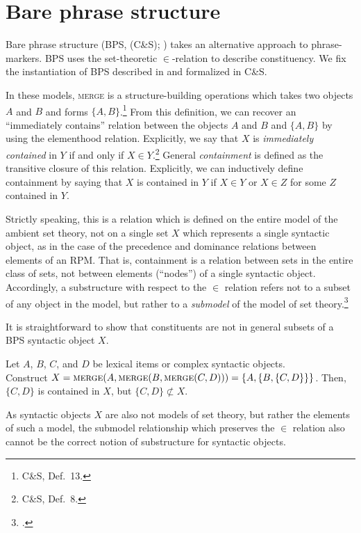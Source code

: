 \documentclass[output=paper]{langsci/langscibook}
\begin{document}
\section{Bare phrase structure}

Bare phrase structure (\gls{BPS}, \citealt{ColSta2016}
(C\&S); \citealt{Chomsky2000,fukui2011merge}) takes an
alternative approach to phrase-markers. \gls{BPS} uses the set-theoretic
$\in$-relation to describe constituency. We fix the instantiation of \gls{BPS}
described in \citet{Chomsky2000,Chomsky2008} and formalized in
C\&S.

In these models, \textsc{merge} is a structure-building operations which takes
two objects $A$ and $B$ and forms $\{A,B\}$.\footnote{C\&S,
Def.\ 13.} From this definition, we can recover an ``immediately contains''
relation between the objects $A$ and $B$ and $\{A,B\}$ by using the elementhood
relation.  Explicitly, we say that $X$ is \emph{immediately contained} in $Y$
if and only if $X\in Y$.\footnote{C\&S, Def.\ 8.} General
\emph{containment} is defined as the transitive closure of this relation.
Explicitly, we can inductively define containment by saying that $X$ is
contained in $Y$ if $X\in Y$ or $X\in Z$ for some $Z$ contained in $Y$.

Strictly speaking, this is a relation which is defined on the entire model of
the ambient set theory, not on a single set $X$ which represents a single
syntactic object, as in the case of the precedence and dominance relations
between elements of an \gls{RPM}. That is,
containment is a relation between sets in the entire class of sets, not between
elements (``nodes'') of a single syntactic object. Accordingly, a substructure
with respect to the $\in$ relation refers not to a subset of any object in the
model, but rather to a \emph{submodel} of the model of set
theory.\footnote{\citet{chang1990model}.}

It is straightforward to show that constituents are not in general subsets of a
\gls{BPS} syntactic object $X$.

\ea\label{ex:33.23}Let $A$, $B$, $C$, and $D$ be lexical items or complex
syntactic objects.\\
    Construct
    $X=\textsc{merge}(A,\textsc{merge}(B,\textsc{merge}(C,D)))=\{A,\{B,\{C,D\}\}\}$.
    Then, $\{C,D\}$ is contained in $X$, but $\{C,D\}\not\subset X$.
\z

As syntactic objects $X$ are also not models of set theory, but rather the
elements of such a model, the submodel relationship which preserves the $\in$
relation also cannot be the correct notion of substructure for syntactic
objects.
\end{document}
